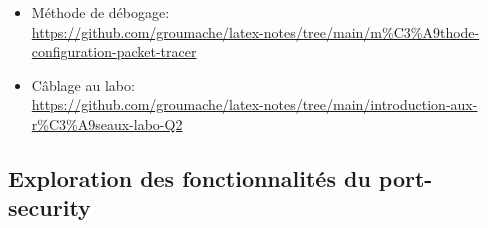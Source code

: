 \documentclass[a4paper]{article}
\begin{document}
\begin{itemize}
    \item Méthode de débogage: \\ \url{https://github.com/groumache/latex-notes/tree/main/m%C3%A9thode-configuration-packet-tracer}
    \item Câblage au labo: \\ \url{https://github.com/groumache/latex-notes/tree/main/introduction-aux-r%C3%A9seaux-labo-Q2}
\end{itemize}











\subsection{Exploration des fonctionnalités du port-security}
\end{document}
